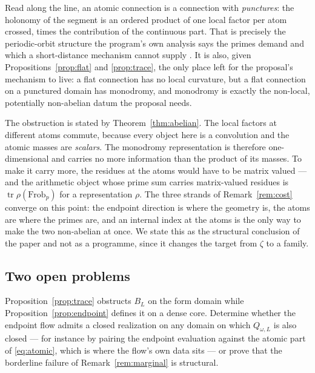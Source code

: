 Read along the line, an atomic connection is a connection with \emph{punctures}:
the holonomy of the segment is an ordered product of one local factor per atom
crossed, times the contribution of the continuous part. That is precisely the
periodic-orbit structure the program's own analysis says the primes demand and
which a short-distance mechanism cannot supply \cite{Bottleneck}. It is also,
given Propositions~\ref{prop:flat} and \ref{prop:trace}, the only place left for
the proposal's mechanism to live: a flat connection has no local curvature, but a
flat connection on a punctured domain has monodromy, and monodromy is exactly the
non-local, potentially non-abelian datum the proposal needs.

The obstruction is stated by Theorem~\ref{thm:abelian}. The local factors at
different atoms commute, because every object here is a convolution and the
atomic masses are \emph{scalars}. The monodromy representation is therefore
one-dimensional and carries no more information than the product of its masses.
To make it carry more, the residues at the atoms would have to be matrix valued
--- and the arithmetic object whose prime sum carries matrix-valued residues is
$\operatorname{tr}\rho(\mathrm{Frob}_p)$ for a representation $\rho$. The three
strands of Remark~\ref{rem:cost} converge on this point: the endpoint direction
is where the geometry is, the atoms are where the primes are, and an internal
index at the atoms is the only way to make the two non-abelian at once. We state
this as the structural conclusion of the paper and not as a programme, since it
changes the target from $\zeta$ to a family.

\subsection{Two open problems}

\begin{problem}
\label{prob:trace}
Proposition~\ref{prop:trace} obstructs $B_L$ on the form domain while
Proposition~\ref{prop:endpoint} defines it on a dense core. Determine whether the
endpoint flow admits a closed realization on any domain on which
$Q_{\omega,L}$ is also closed --- for instance by pairing the endpoint evaluation
against the atomic part of \eqref{eq:atomic}, which is where the flow's own data
sits --- or prove that the borderline failure of Remark~\ref{rem:marginal} is
structural.
\end{problem}

